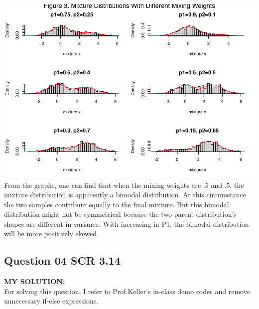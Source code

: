 \documentclass[
]{article}
\begin{document}
\includegraphics{HW_02_Chenguang_Pan_files/figure-latex/unnamed-chunk-4-1.pdf}
From the graphs, one can find that when the mixing weights are .5 and
.5, the mixture distribution is apparently a bimodal distribution. At
this circumstance the two samples contribute equally to the final
mixture. But this bimodal distribution might not be symmetrical because
the two parent distribution's shapes are different in variance. With
increasing in P1, the bimodal distribution will be more positively
skewed.

\hypertarget{question-04-scr-3.14}{%
\subsection{Question 04 SCR 3.14}\label{question-04-scr-3.14}}

\textbf{MY SOLUTION:}\\
For solving this question, I refer to Prof.Keller's in-class demo codes
and remove unnecessary if-else expressions.
\end{document}
